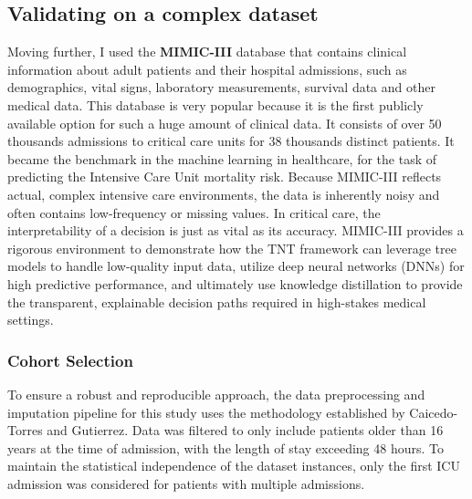 \subsection{Validating on a complex dataset}
Moving further, I used the \textbf{MIMIC-III}\cite{johnson2016mimic} database that contains clinical information about adult patients and their hospital admissions, such as demographics, vital signs, laboratory measurements, survival data and other medical data. This database is very popular because it is the first publicly available option for such a huge amount of clinical data. It consists of over 50 thousands admissions to critical care units for 38 thousands distinct patients. It became the benchmark in the machine learning in healthcare, for the task of predicting the Intensive Care Unit mortality risk.
Because MIMIC-III reflects actual, complex intensive care environments, the data is inherently noisy and often contains low-frequency or missing values. In critical care, the interpretability of a decision is just as vital as its accuracy. MIMIC-III provides a rigorous environment to demonstrate how the TNT framework can leverage tree models to handle low-quality input data, utilize deep neural networks (DNNs) for high predictive performance, and ultimately use knowledge distillation to provide the transparent, explainable decision paths required in high-stakes medical settings.

\subsubsection{Cohort Selection}
To ensure a robust and reproducible approach, the data preprocessing and imputation pipeline for this study uses the methodology established by Caicedo-Torres and Gutierrez\cite{caicedo2019iseeu}. Data was filtered to only include patients older than 16 years at the time of admission, with the length of stay exceeding 48 hours. To maintain the statistical independence of the dataset instances, only the first ICU admission was considered for patients with multiple admissions.

